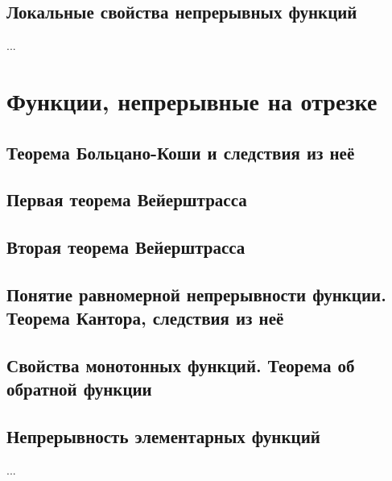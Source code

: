 \subsection{Локальные свойства непрерывных функций}
...

\section{Функции, непрерывные на отрезке}
\subsection{Теорема Больцано-Коши и следствия из неё}

\subsection{Первая теорема Вейерштрасса}

\subsection{Вторая теорема Вейерштрасса}

\subsection{Понятие равномерной непрерывности функции. Теорема Кантора, следствия из неё}


\subsection{Свойства монотонных функций. Теорема об обратной функции}


\subsection{Непрерывность элементарных функций}
...

